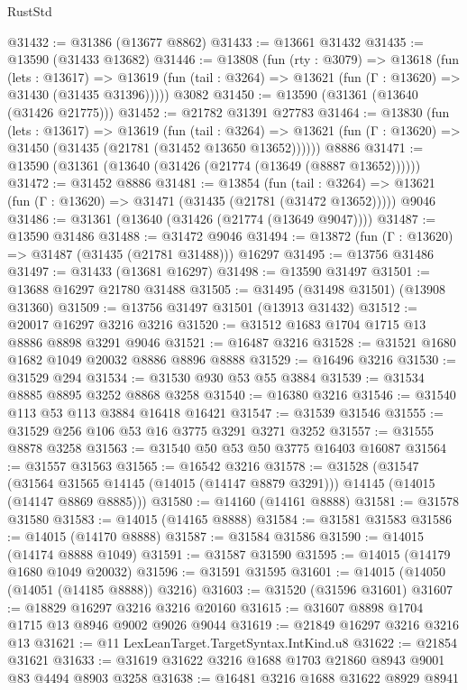 \begin{lexlean}{RustStd}
\begin{coremodule}
@31432 := @31386 (@13677 @8862)
@31433 := @13661 @31432
@31435 := @13590 (@31433 @13682)
@31446 := @13808
    (fun (rty : @3079) =>
    @13618
      (fun (lets : @13617) =>
      @13619 (fun (tail : @3264) => @13621 (fun (Γ : @13620) => @31430 (@31435 @31396)))))
    @3082
@31450 := @13590 (@31361 (@13640 (@31426 @21775)))
@31452 := @21782 @31391 @27783
@31464 := @13830
    (fun (lets : @13617) =>
    @13619
      (fun (tail : @3264) =>
      @13621 (fun (Γ : @13620) => @31450 (@31435 (@21781 (@31452 @13650 @13652))))))
    @8886
@31471 := @13590 (@31361 (@13640 (@31426 (@21774 (@13649 (@8887 @13652))))))
@31472 := @31452 @8886
@31481 := @13854
    (fun (tail : @3264) => @13621 (fun (Γ : @13620) => @31471 (@31435 (@21781 (@31472 @13652)))))
    @9046
@31486 := @31361 (@13640 (@31426 (@21774 (@13649 @9047))))
@31487 := @13590 @31486
@31488 := @31472 @9046
@31494 := @13872 (fun (Γ : @13620) => @31487 (@31435 (@21781 @31488))) @16297
@31495 := @13756 @31486
@31497 := @31433 (@13681 @16297)
@31498 := @13590 @31497
@31501 := @13688 @16297 @21780 @31488
@31505 := @31495 (@31498 @31501) (@13908 @31360)
@31509 := @13756 @31497 @31501 (@13913 @31432)
@31512 := @20017 @16297 @3216 @3216
@31520 := @31512 @1683 @1704 @1715 @13 @8886 @8898 @3291 @9046
@31521 := @16487 @3216
@31528 := @31521 @1680 @1682 @1049 @20032 @8886 @8896 @8888
@31529 := @16496 @3216
@31530 := @31529 @294
@31534 := @31530 @930 @53 @55 @3884
@31539 := @31534 @8885 @8895 @3252 @8868 @3258
@31540 := @16380 @3216
@31546 := @31540 @113 @53 @113 @3884 @16418 @16421
@31547 := @31539 @31546
@31555 := @31529 @256 @106 @53 @16 @3775 @3291 @3271 @3252
@31557 := @31555 @8878 @3258
@31563 := @31540 @50 @53 @50 @3775 @16403 @16087
@31564 := @31557 @31563
@31565 := @16542 @3216
@31578 := @31528
    (@31547
      (@31564 @31565 @14145 (@14015 (@14147 @8879 @3291)))
      @14145
      (@14015 (@14147 @8869 @8885)))
@31580 := @14160 (@14161 @8888)
@31581 := @31578 @31580
@31583 := @14015 (@14165 @8888)
@31584 := @31581 @31583
@31586 := @14015 (@14170 @8888)
@31587 := @31584 @31586
@31590 := @14015 (@14174 @8888 @1049)
@31591 := @31587 @31590
@31595 := @14015 (@14179 @1680 @1049 @20032)
@31596 := @31591 @31595
@31601 := @14015 (@14050 (@14051 (@14185 @8888)) @3216)
@31603 := @31520 (@31596 @31601)
@31607 := @18829 @16297 @3216 @3216 @20160
@31615 := @31607 @8898 @1704 @1715 @13 @8946 @9002 @9026 @9044
@31619 := @21849 @16297 @3216 @3216 @13
@31621 := @11 LexLeanTarget.TargetSyntax.IntKind.u8
@31622 := @21854 @31621
@31633 := @31619 @31622 @3216 @1688 @1703 @21860 @8943 @9001 @83 @4494 @8903 @3258
@31638 := @16481 @3216 @1688 @31622 @8929 @8941

\end{coremodule}
\end{lexlean}
